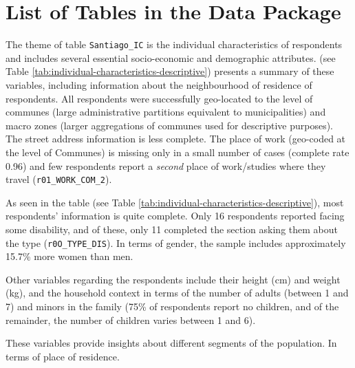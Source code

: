 \documentclass[
11pt, %
oneside, %
english, %
singlespacing, %
]{macthesis} %
\begin{document}
\hypertarget{list-of-tables-in-the-data-package}{%
\section{List of Tables in the Data Package}\label{list-of-tables-in-the-data-package}}

The theme of table \texttt{Santiago\_IC} is the individual characteristics of respondents and includes several essential socio-economic and demographic attributes. (see Table \ref{tab:individual-characteristics-descriptive}) presents a summary of these variables, including information about the neighbourhood of residence of respondents. All respondents were successfully geo-located to the level of communes (large administrative partitions equivalent to municipalities) and macro zones (larger aggregations of communes used for descriptive purposes). The street address information is less complete. The place of work (geo-coded at the level of Communes) is missing only in a small number of cases (complete rate 0.96) and few respondents report a \emph{second} place of work/studies where they travel (\texttt{r01\_WORK\_COM\_2}).

As seen in the table (see Table \ref{tab:individual-characteristics-descriptive}), most respondents' information is quite complete. Only 16 respondents reported facing some disability, and of these, only 11 completed the section asking them about the type (\texttt{r0O\_TYPE\_DIS}). In terms of gender, the sample includes approximately 15.7\% more women than men.

Other variables regarding the respondents include their height (cm) and weight (kg), and the household context in terms of the number of adults (between 1 and 7) and minors in the family (75\% of respondents report no children, and of the remainder, the number of children varies between 1 and 6).

These variables provide insights about different segments of the population. In terms of place of residence.
\end{document}

